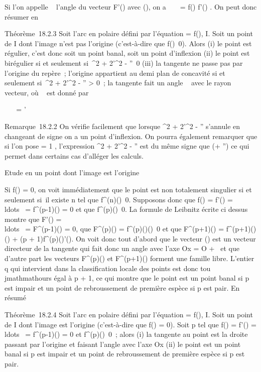\documentclass[]{article}
\begin{document}
Si l'on appelle \alpha~ l'angle du vecteur F'(\theta) avec
\vecu(\theta), on a
\mathrmtg~ \alpha~ = f(\theta)
\over f'(\theta) . On peut donc résumer en

Théorème~18.2.3 Soit \Gamma l'arc en polaire défini par l'équation \rho = f(\theta),
\theta \in I. Soit \theta un point de I dont l'image n'est pas l'origine
(c'est-à-dire que f(\theta)\neq~0). Alors (i) le point
est régulier, c'est donc soit un point banal, soit un point d'inflexion
(ii) le point est birégulier si et seulement si~\rho^2 +
2\rho'^2 - \rho\rho''\neq~0 (iii) la tangente
ne passe pas par l'origine du repère~; l'origine appartient au demi plan
de concavité si et seulement si~\rho^2 + 2\rho'^2 - \rho\rho''
\textgreater{} 0~; la tangente fait un angle \alpha~ avec le rayon vecteur, où
\alpha~ est donné par

\mathrmtg~ \alpha~ = \rho
\over \rho'

Remarque~18.2.2 On vérifie facilement que lorsque \rho^2 +
2\rho'^2 - \rho\rho'' s'annule en changeant de signe on a un point
d'inflexion. On pourra également remarquer que si l'on pose \phi = 1
\over \rho , l'expression \rho^2 +
2\rho'^2 - \rho\rho'' est du même signe que \phi(\phi + \phi'') ce qui permet
dans certains cas d'alléger les calculs.

Etude en un point dont l'image est l'origine

Si f(\theta) = 0, on voit immédiatement que le point est non totalement
singulier si et seulement si~il existe n tel que
f^(n)(\theta)\neq~0. Supposons donc que
f(\theta) = f'(\theta) =
\\ldots~ =
f^(p-1)(\theta) = 0 et que
f^(p)(\theta)\neq~0. La formule de Leibnitz
écrite ci dessus montre que F'(\theta) =
\\ldots~ =
F^(p-1)(\theta) = 0, que F^(p)(\theta) =
f^(p)(\theta)\vecu(\theta)\neq~0
et que F^(p+1)(\theta) =
f^(p+1)(\theta)\vecu(\theta) + (p +
1)f^(p)(\theta)\vecu'(\theta). On voit donc tout
d'abord que le vecteur \vecu(\theta) est un vecteur
directeur de la tangente qui fait donc un angle \theta avec l'axe Ox = O +
~\vec\imath et que d'autre part les vecteurs
F^(p)(\theta) et F^(p+1)(\theta) forment une famille libre.
L'entier q qui intervient dans la classification locale des points est
donc tou\\jmathmathours égal à p + 1, ce qui montre que le point est un point
banal si p est impair et un point de rebroussement de première espèce si
p est pair. En résumé

Théorème~18.2.4 Soit \Gamma l'arc en polaire défini par l'équation \rho = f(\theta),
\theta \in I. Soit \theta un point de I dont l'image est l'origine (c'est-à-dire que
f(\theta) = 0). Soit p tel que f(\theta) = f'(\theta) =
\\ldots~ =
f^(p-1)(\theta) = 0 et
f^(p)(\theta)\neq~0~; alors (i) la tangente
au point \theta est la droite passant par l'origine et faisant l'angle \theta avec
l'axe Ox (ii) le point est un point banal si p est impair et un point de
rebroussement de première espèce si p est pair.
\end{document}
